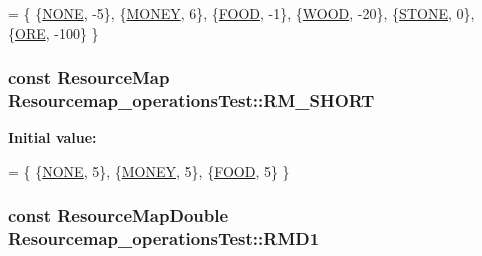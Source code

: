 \begin{DoxyCode}
= \{
        \{\hyperlink{namespaceCourse_a02d49c04029594d4adba79b84bb85f65ae3def61eb1a9033cc0b0d1d2c3c6ff84}{NONE}, -5\},
        \{\hyperlink{namespaceCourse_a02d49c04029594d4adba79b84bb85f65aff016add6bbbdbb44abf1d2d7f215ec0}{MONEY}, 6\},
        \{\hyperlink{namespaceCourse_a02d49c04029594d4adba79b84bb85f65a7018c47af38bfc1390a89e70b4cf4760}{FOOD}, -1\},
        \{\hyperlink{namespaceCourse_a02d49c04029594d4adba79b84bb85f65a87287be3009253b983ffb2e9f91eef22}{WOOD}, -20\},
        \{\hyperlink{namespaceCourse_a02d49c04029594d4adba79b84bb85f65a8598c3079c2be7785410e724cc190229}{STONE}, 0\},
        \{\hyperlink{namespaceCourse_a02d49c04029594d4adba79b84bb85f65af416a215c7dad21349df38d35be0a1e1}{ORE}, -100\}
    \}
\end{DoxyCode}
\hypertarget{classResourcemap__operationsTest_acfdf7232f48fe12d25658b10ec14fc0b}{
\subsubsection[{R\-M\-\_\-\-S\-H\-O\-R\-T}]{\setlength{\rightskip}{0pt plus 5cm}const {\bf Resource\-Map} Resourcemap\-\_\-operations\-Test\-::\-R\-M\-\_\-\-S\-H\-O\-R\-T\hspace{0.3cm}{\ttfamily [private]}}}\label{classResourcemap__operationsTest_acfdf7232f48fe12d25658b10ec14fc0b}
{\bfseries Initial value\-:}
\begin{DoxyCode}
= \{
        \{\hyperlink{namespaceCourse_a02d49c04029594d4adba79b84bb85f65ae3def61eb1a9033cc0b0d1d2c3c6ff84}{NONE}, 5\},
        \{\hyperlink{namespaceCourse_a02d49c04029594d4adba79b84bb85f65aff016add6bbbdbb44abf1d2d7f215ec0}{MONEY}, 5\},
        \{\hyperlink{namespaceCourse_a02d49c04029594d4adba79b84bb85f65a7018c47af38bfc1390a89e70b4cf4760}{FOOD}, 5\}
    \}
\end{DoxyCode}
\hypertarget{classResourcemap__operationsTest_ad2af6115310ec9581944052356d9d44a}{
\subsubsection[{R\-M\-D1}]{\setlength{\rightskip}{0pt plus 5cm}const {\bf Resource\-Map\-Double} Resourcemap\-\_\-operations\-Test\-::\-R\-M\-D1\hspace{0.3cm}{\ttfamily [private]}}}\label{classResourcemap__operationsTest_ad2af6115310ec9581944052356d9d44a}
